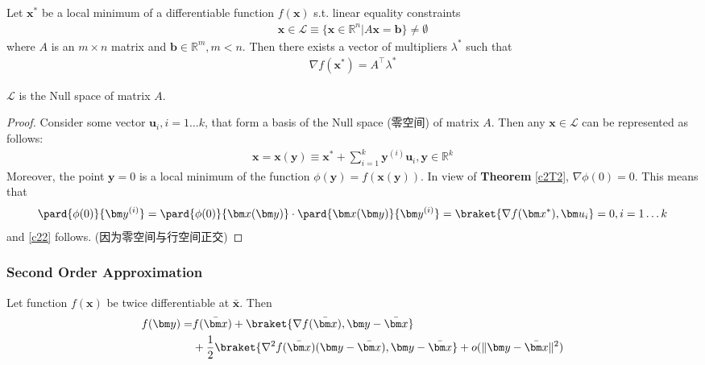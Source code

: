 \begin{corollary}
    Let $\bm x^*$ be a local minimum of a differentiable function $f(\bm x)$ s.t. linear equality constraints
    \begin{align*}
        \bm x\in\mathcal{L}\equiv\{ \bm x \in \mathbb{R}^n | A\bm x=\bm b \}\ne \emptyset
    \end{align*}
    where $A$ is an $m\times n$ matrix and $\bm b\in \mathbb{R}^m, m<n$. Then there exists a vector of multipliers $\lambda^*$ such that
    \begin{align}
        \nabla f(\bm x^*)=A^\top\lambda^* \label{c22}
    \end{align}
\end{corollary}
$\mathcal{L}$ is the Null space of matrix $A$. 
\begin{proof}
    Consider some vector $\bm u_i,i=1\dots k$, that form a basis of the Null space (零空间) of matrix $A$. Then any $\bm x\in\mathcal{L}$ can be represented as follows:
    \begin{align*}
        \bm x=\bm x(\bm y)\equiv \bm x^*+\sum_{i=1}^k\bm y^{(i)}\bm u_i, \bm y\in\mathbb{R}^k
    \end{align*}
    Moreover, the point $\bm y=0$ is a local minimum of the function $\phi(\bm y)=f(\bm x(\bm y))$. In view of \textbf{Theorem} \ref{c2T2}, $\nabla \phi(0)=0$. This means that 
    \begin{align*}
        \pard{\phi(0)}{\bm y^{(i)}}=\pard{\phi(0)}{\bm x(\bm y)}\cdot\pard{\bm x(\bm y)}{\bm y^{(i)}}=\braket{\nabla f(\bm x^*), \bm u_i}=0,i=1\dots k
    \end{align*}
    and \ref{c22} follows. (因为零空间与行空间正交)
\end{proof}

\subsubsection{Second Order Approximation}
Let function $f(\bm x)$ be twice differentiable at $\bar{\bm x}$. Then 
\begin{align*}
    f(\bm y)=&f(\bar{\bm x})+\braket{\nabla f(\bar{\bm x}),\bm y-\bar{\bm x}}\\
    &+\frac{1}{2}\braket{\nabla^2 f(\bar{\bm x})(\bm y-\bar{\bm x}),\bm y-\bar{\bm x}}+o(\|\bm y-\bar{\bm x}\|^2)
\end{align*}

